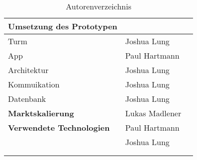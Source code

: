 \begin{longtable}{l|l|r}
  \textbf{Umsetzung des Prototypen}      &                &                     \\ \hline
  Turm                                   & Joshua Lung    &                     \\ \hline
  App                                    & Paul Hartmann  &                     \\ \hline
  Architektur                            & Joshua Lung    &                     \\ \hline
  Kommuikation                           & Joshua Lung    &                     \\ \hline
  Datenbank                              & Joshua Lung    &                     \\ \hline
  \textbf{Marktskalierung}               & Lukas Madlener &                     \\ \hline
  \textbf{Verwendete Technologien}        & Paul Hartmann  &                     \\
                                         & Joshua Lung    &                     \\ \hline
  

  \multicolumn{3}{c}{}                                                          \\

  \caption{Autorenverzeichnis}
  \label{tab:autorenverzeichnis}
\end{longtable}





